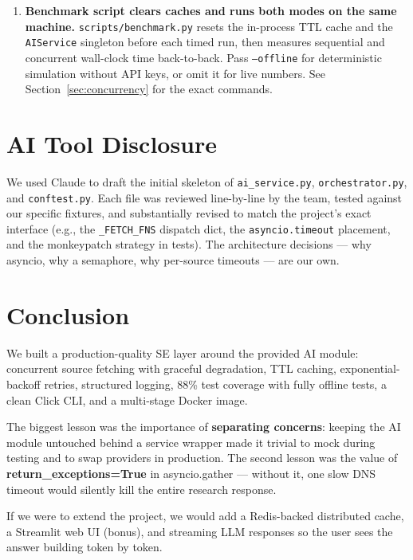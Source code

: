 \documentclass[12pt,a4paper]{article}
\begin{document}
\begin{enumerate}
    and \texttt{TIMESTAMPTZ} support.  SQLite would reduce deployment friction (no server
    process), but \texttt{aiosqlite} lacks a connection-pool primitive, and SQLite's
    JSON storage is unindexed plain text.  The Docker Compose setup provides zero-config
    local Postgres, and graceful degradation means the app runs fully without any database.
    A future SQLite fallback path remains possible by introducing a dialect abstraction in
    \texttt{repository.py}.
  \item \textbf{Benchmark script clears caches and runs both modes on the same machine.}
    \texttt{scripts/benchmark.py} resets the in-process TTL cache and the \texttt{AIService}
    singleton before each timed run, then measures sequential and concurrent wall-clock time
    back-to-back.  Pass \texttt{--offline} for deterministic simulation without API keys, or
    omit it for live numbers.  See Section~\ref{sec:concurrency} for the exact commands.
\end{enumerate}

\section{AI Tool Disclosure}

We used Claude to draft the initial skeleton of \texttt{ai\_service.py},
\texttt{orchestrator.py}, and \texttt{conftest.py}. Each file was reviewed line-by-line by the
team, tested against our specific fixtures, and substantially revised to match the project's
exact interface (e.g., the \texttt{\_FETCH\_FNS} dispatch dict, the \texttt{asyncio.timeout}
placement, and the monkeypatch strategy in tests). The architecture decisions — why asyncio,
why a semaphore, why per-source timeouts — are our own.

\section{Conclusion}

We built a production-quality SE layer around the provided AI module: concurrent source
fetching with graceful degradation, TTL caching, exponential-backoff retries, structured
logging, 88\% test coverage with fully offline tests, a clean Click CLI, and a multi-stage
Docker image.

The biggest lesson was the importance of \textbf{separating concerns}: keeping the AI module
untouched behind a service wrapper made it trivial to mock during testing and to swap
providers in production. The second lesson was the value of \textbf{return\_exceptions=True}
in asyncio.gather — without it, one slow DNS timeout would silently kill the entire research
response.

If we were to extend the project, we would add a Redis-backed distributed cache, a Streamlit
web UI (bonus), and streaming LLM responses so the user sees the answer building token by token.
\end{document}
